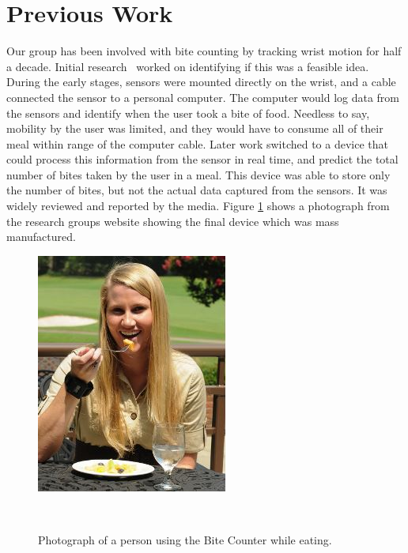 \section{Previous Work}
Our group has been involved with bite counting by tracking wrist motion for half a decade.
Initial research~\cite{dong2012new} worked on identifying if this was a feasible idea.
During the early stages,
sensors were mounted directly on the wrist,
and a cable connected the sensor to a personal computer.
The computer would log data from the sensors and identify when the user took a bite of food.
Needless to say,
mobility by the user was limited,
and they would have to consume all of their meal within range of the computer cable.
Later work switched to a device that could process this information from the sensor in real time,
and predict the total number of bites taken by the user in a meal.
This device was able to store only the number of bites, 
but not the actual data captured from the sensors.
It was widely reviewed and reported by the media.
Figure \ref{Fig:BCEater} shows a photograph from the research groups website showing the final device which was mass manufactured.

\begin{figure}
        \centering
                \includegraphics[]{images/BCEater.JPG}

                \label{fig:gull}
        ~ %
         \caption{Photograph of a person using the Bite Counter while eating.}\label{Fig:BCEater}
\end{figure}

